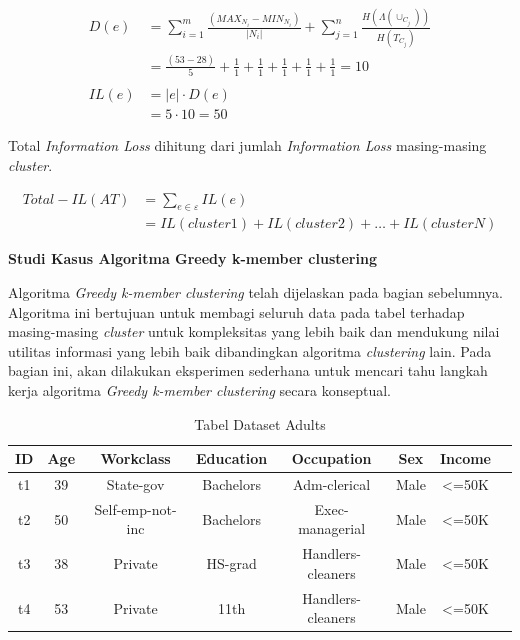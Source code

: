 \documentclass[a4paper,twoside]{article}
\begin{document}
\begin{enumerate}
\begin{enumerate}
\begin{align*}
D(e) &= \sum_{i=1}^{m} \frac{(MAX_{N_i} - MIN_{N_i})}{|N_i|} + \sum_{j=1}^{n}\frac{H(\Lambda(\cup_{C_j}))}{H(T_{C_j})}\\
&= \frac{(53 - 28)}{5} + \frac{1}{1}+\frac{1}{1}+\frac{1}{1}+\frac{1}{1}+\frac{1}{1} = 10\\\\
IL(e) &= |e| \cdot D(e)\\
&= 5 \cdot 10 = 50
\end{align*}

\noindent Total \textit{Information Loss} dihitung dari jumlah \textit{Information Loss} masing-masing \textit{cluster}.

\begin{align*}
Total-IL(AT) &= \sum_{e \in \varepsilon}^{}  IL(e)\\
&= IL(cluster1)+IL(cluster2)+\ldots+IL(clusterN)
\end{align*}

\end{enumerate}
		
\textbf{Studi Kasus Algoritma Greedy k-member clustering}

 Algoritma \textit{Greedy k-member clustering} telah dijelaskan pada bagian sebelumnya. Algoritma ini bertujuan untuk membagi seluruh data pada tabel terhadap masing-masing \textit{cluster} untuk kompleksitas yang lebih baik dan mendukung nilai utilitas informasi yang lebih baik dibandingkan algoritma \textit{clustering} lain. Pada bagian ini, akan dilakukan eksperimen sederhana untuk mencari tahu langkah kerja algoritma \textit{Greedy k-member clustering} secara konseptual.
 
\begin{table}[H]
\centering
\caption{Tabel Dataset Adults}
\begin{tabular}{c c c c c c c c}
\hline 
ID & Age & Workclass & Education & Occupation & Sex & Income\\ 
\hline 
t1 & 39 & State-gov & Bachelors & Adm-clerical & Male & <=50K \\ 

t2 & 50 & Self-emp-not-inc & Bachelors & Exec-managerial & Male & <=50K  \\ 

t3 & 38 & Private & HS-grad & Handlers-cleaners & Male & <=50K  \\ 

t4 & 53 & Private & 11th & Handlers-cleaners & Male & <=50K  \\ 
 

\end{tabular}
\end{table}
\end{enumerate}
\end{document}

